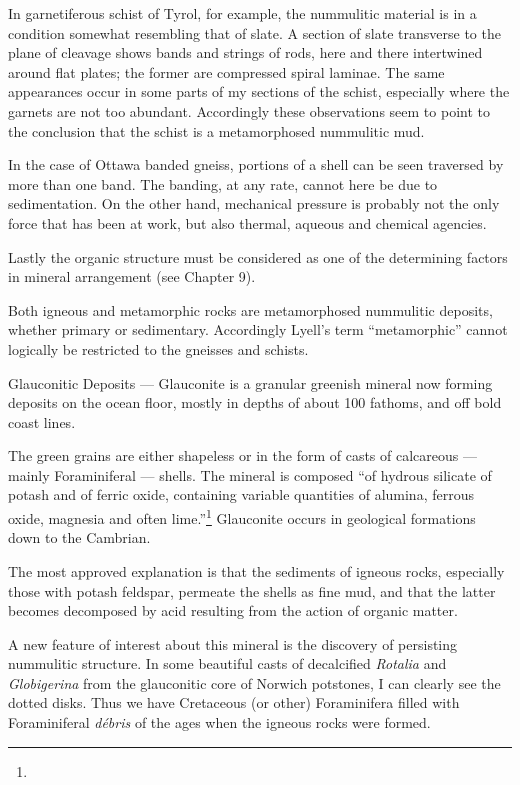 \documentclass[a4paper, 12pt, oneside]{article}
\begin{document}
In garnetiferous schist of Tyrol, for example, the nummulitic material is in a condition somewhat resembling that of slate. A section of slate transverse to the plane of cleavage shows bands and strings of rods, here and there intertwined around flat plates; the former are compressed spiral laminae. The same appearances occur in some parts of my sections of the schist, especially where the garnets are not too abundant. Accordingly these observations seem to point to the conclusion that the schist is a metamorphosed nummulitic mud.

In the case of Ottawa banded gneiss, portions of a shell can be seen traversed by more than one band. The banding, at any rate, cannot here be due to sedimentation. On the other hand, mechanical pressure is probably not the only force that has been at work, but also thermal, aqueous and chemical agencies.

Lastly the organic structure must be considered as one of the determining factors in mineral arrangement (see Chapter 9).

Both igneous and metamorphic rocks are metamorphosed nummulitic deposits, whether primary or sedimentary. Accordingly Lyell's term ``metamorphic'' cannot logically be restricted to the gneisses and schists.

Glauconitic Deposits --- Glauconite is a granular greenish mineral now forming deposits on the ocean floor, mostly in depths of about 100 fathoms, and off bold coast lines.

The green grains are either shapeless or in the form of casts of calcareous --- mainly Foraminiferal --- shells. The mineral is composed ``of hydrous silicate of potash and of ferric oxide, containing variable quantities of alumina, ferrous oxide, magnesia and often lime.''\footnote{} Glauconite occurs in geological formations down to the Cambrian.

The most approved explanation is that the sediments of igneous rocks, especially those with potash feldspar, permeate the shells as fine mud, and that the latter becomes decomposed by acid resulting from the action of organic matter.

A new feature of interest about this mineral is the discovery of persisting nummulitic structure. In some beautiful casts of decalcified \emph{Rotalia} and \emph{Globigerina} from the glauconitic core of Norwich potstones, I can clearly see the dotted disks. Thus we have Cretaceous (or other) Foraminifera filled with Foraminiferal \emph{débris} of the ages when the igneous rocks were formed.
\end{document}
